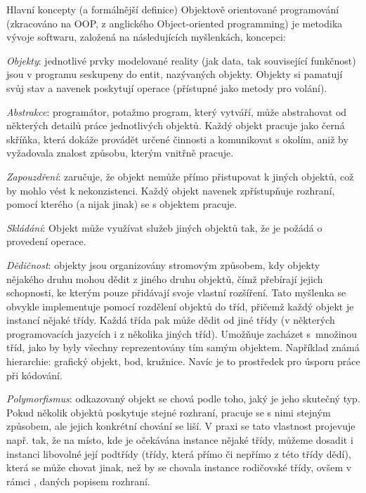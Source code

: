 \begin{obecne}{Hlavní koncepty (a formálnější definice)}
Objektově orientované programování (zkracováno na OOP, z anglického Object-oriented programming) je metodika vývoje softwaru, založená na následujících myšlenkách, koncepci:
\begin{pitemize}
	\item \emph{Objekty}: jednotlivé prvky modelované reality (jak data, tak související funkčnost) jsou v programu seskupeny do entit, nazývaných objekty. Objekty si pamatují svůj stav a navenek poskytují operace (přístupné jako metody pro volání).
	\item \emph{Abstrakce}: programátor, potažmo program, který vytváří, může abstrahovat od některých detailů práce jednotlivých objektů. Každý objekt pracuje jako černá skříňka, která dokáže provádět určené činnosti a komunikovat s okolím, aniž by vyžadovala znalost způsobu, kterým vnitřně pracuje.
	\item \emph{Zapouzdření}: zaručuje, že objekt nemůže přímo přistupovat k  jiných objektů, což by mohlo vést k nekonzistenci. Každý objekt navenek zpřístupňuje rozhraní, pomocí kterého (a nijak jinak) se s objektem pracuje.
	\item \emph{Skládání}: Objekt může využívat služeb jiných objektů tak, že je požádá o provedení operace.
	\item \emph{Dědičnost}: objekty jsou organizovány stromovým způsobem, kdy objekty nějakého druhu mohou dědit z jiného druhu objektů, čímž přebírají jejich schopnosti, ke kterým pouze přidávají svoje vlastní rozšíření. Tato myšlenka se obvykle implementuje pomocí rozdělení objektů do tříd, přičemž každý objekt je instancí nějaké třídy. Každá třída pak může dědit od jiné třídy (v některých programovacích jazycích i z několika jiných tříd). Umožňuje zacházet s~množinou tříd, jako by byly všechny reprezentovány tím samým objektem. Například známá hierarchie: grafický objekt, bod, kružnice. Navíc je to prostředek pro úsporu práce při kódování.
	\item \emph{Polymorfismus}: odkazovaný objekt se chová podle toho, jaký je jeho skutečný typ. Pokud několik objektů poskytuje stejné rozhraní, pracuje se s nimi stejným způsobem, ale jejich konkrétní chování se liší. V praxi se tato vlastnost projevuje např. tak, že na místo, kde je očekávána instance nějaké třídy, můžeme dosadit i instanci libovolné její podtřídy (třídy, která přímo či nepřímo z této třídy dědí), která se může chovat jinak, než by se chovala instance rodičovské třídy, ovšem v rámci , daných popisem rozhraní. 
\end{pitemize}
\end{obecne}

